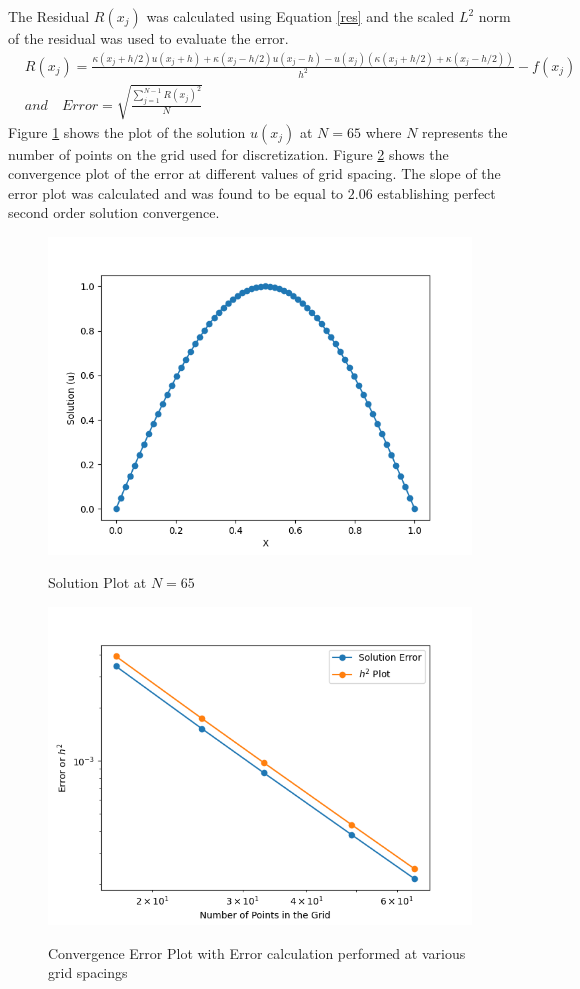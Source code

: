 \documentclass[12pt]{article}
\begin{document}
The Residual $R(x_j)$ was calculated using Equation \ref{res} and the scaled $L^2$ norm of the residual was used to evaluate the error.
\begin{equation} \label{res}
    \begin{aligned}
        & R(x_j) = \frac{\kappa( x_j + h/2 ) u(x_j + h) + \kappa( x_j - h/2 )u( x_j - h ) - u(x_j)( \kappa(x_j + h/2) + \kappa(x_j - h/2) )}{h^2} - f(x_j) \\
        & and \quad Error = \sqrt{ \frac{\sum_{j = 1}^{N - 1} R(x_j)^2}{N} }
    \end{aligned}
\end{equation}
Figure \ref{solplot} shows the plot of the solution $u(x_j)$ at $N = 65$ where $N$ represents the number of points on the grid used for discretization. Figure \ref{errorplot} shows the convergence plot of the error at different values of grid spacing. The slope of the error plot was calculated and was found to be equal to $2.06$ establishing perfect second order solution convergence. 
\begin{figure}
\centering
    {\includegraphics[width=14cm]{Solution_Plot_65.png} }%
    \caption{Solution Plot at $N = 65$}%
    \label{solplot}%
\end{figure}
\begin{figure}
\centering
    {\includegraphics[width=14cm]{Error_Plot.png} }%
    \caption{Convergence Error Plot with Error calculation performed at various grid spacings}%
    \label{errorplot}
\end{figure}
\end{document}
